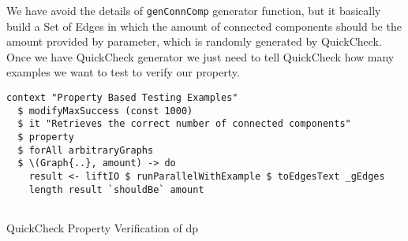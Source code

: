 \documentclass[preprint]{elsarticle}
\begin{document}
We have avoid the details of \texttt{genConnComp} generator function, but it basically build a Set of Edges 
in which the amount of connected components should be the amount provided by parameter, which is randomly generated by QuickCheck.
Once we have QuickCheck generator we just need to tell QuickCheck how many examples we want to test to verify our property.

\begin{listing}[H]
\begin{verbatim}      
context "Property Based Testing Examples"
  $ modifyMaxSuccess (const 1000)
  $ it "Retrieves the correct number of connected components"
  $ property
  $ forAll arbitraryGraphs 
  $ \(Graph{..}, amount) -> do 
    result <- liftIO $ runParallelWithExample $ toEdgesText _gEdges
    length result `shouldBe` amount
    
\end{verbatim}
\caption{QuickCheck Property Verification of \acrshort{dp}}
\label{src:haskell:8}
\end{listing}
\end{document}
